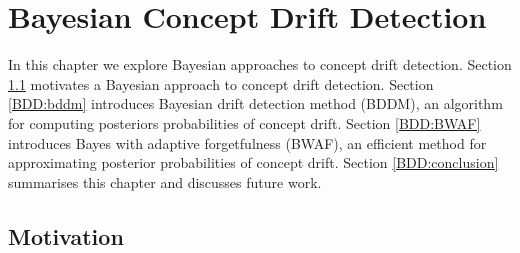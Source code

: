 \chapter{Bayesian Concept Drift Detection} \label{chapt:BDD}

In this chapter we explore Bayesian approaches to concept drift detection. Section \ref{BDD:motivation} motivates a Bayesian approach to concept drift detection. Section \ref{BDD:bddm} introduces Bayesian drift detection method (BDDM), an algorithm for computing posteriors probabilities of concept drift. Section \ref{BDD:BWAF} introduces Bayes with adaptive forgetfulness (BWAF), an efficient method for approximating posterior probabilities of concept drift. Section \ref{BDD:conclusion} summarises this chapter and discusses future work.


\section{Motivation} \label{BDD:motivation}

